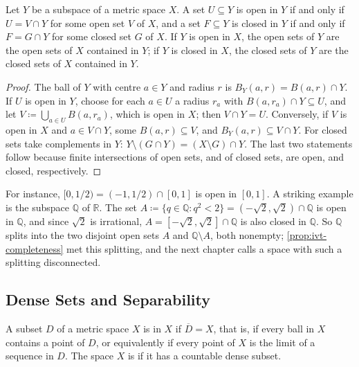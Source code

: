 \begin{proposition}
\label{prop:relative-open}
Let $Y$ be a subspace of a metric space $X$. A set $U\subseteq Y$ is open in $Y$ if and only if $U=V\cap Y$ for some open set $V$ of $X$, and a set $F\subseteq Y$ is closed in $Y$ if and only if $F=G\cap Y$ for some closed set $G$ of $X$. If $Y$ is open in $X$, the open sets of $Y$ are the open sets of $X$ contained in $Y$; if $Y$ is closed in $X$, the closed sets of $Y$ are the closed sets of $X$ contained in $Y$.
\end{proposition}

\begin{proof}
The ball of $Y$ with centre $a\in Y$ and radius $r$ is $B_Y(a,r)=B(a,r)\cap Y$. If $U$ is open in $Y$, choose for each $a\in U$ a radius $r_a$ with $B(a,r_a)\cap Y\subseteq U$, and let $V\coloneqq\bigcup_{a\in U}B(a,r_a)$, which is open in $X$; then $V\cap Y=U$. Conversely, if $V$ is open in $X$ and $a\in V\cap Y$, some $B(a,r)\subseteq V$, and $B_Y(a,r)\subseteq V\cap Y$. For closed sets take complements in $Y$: $Y\setminus(G\cap Y)=(X\setminus G)\cap Y$. The last two statements follow because finite intersections of open sets, and of closed sets, are open, and closed, respectively.
\end{proof}

For instance, $[0,1/2)=(-1,1/2)\cap[0,1]$ is open in $[0,1]$. A striking example is the subspace $\mathbb Q$ of $\mathbb R$. The set $A\coloneqq\{q\in\mathbb Q: q^2<2\}=(-\sqrt2,\sqrt2)\cap\mathbb Q$ is open in $\mathbb Q$, and since $\sqrt2$ is irrational, $A=[-\sqrt2,\sqrt2]\cap\mathbb Q$ is also closed in $\mathbb Q$. So $\mathbb Q$ splits into the two disjoint open sets $A$ and $\mathbb Q\setminus A$, both nonempty; \cref{prop:ivt-completeness} met this splitting, and the next chapter calls a space with such a splitting disconnected.

\subsection{Dense Sets and Separability}

\begin{definition}
\label{def:dense}
A subset $D$ of a metric space $X$ is  in $X$ if $\overline D=X$, that is, if every ball in $X$ contains a point of $D$, or equivalently if every point of $X$ is the limit of a sequence in $D$. The space $X$ is  if it has a countable dense subset.
\end{definition}

